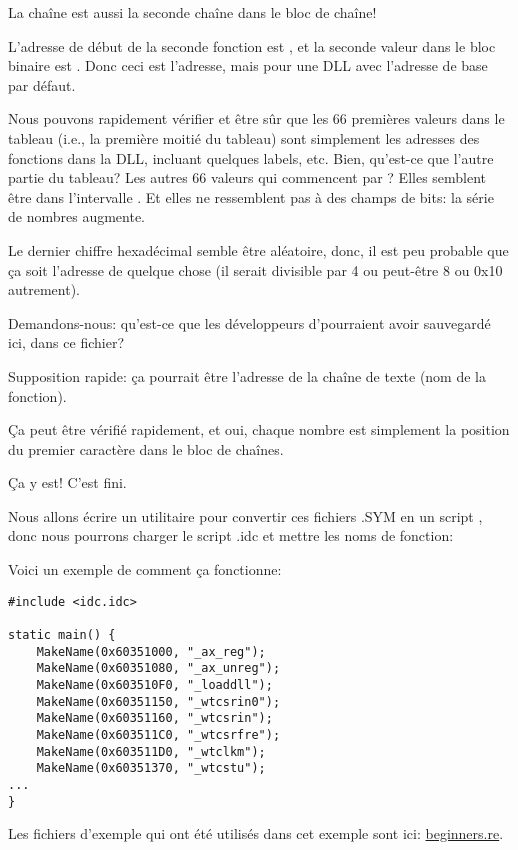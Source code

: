 La chaîne  est aussi la seconde chaîne dans le bloc de chaîne!

L'adresse de début de la seconde fonction est , et la seconde
valeur dans le bloc binaire est .
Donc ceci est l'adresse, mais pour une DLL avec l'adresse de base par défaut.

Nous pouvons rapidement vérifier et être sûr que les 66 premières valeurs dans
le tableau (i.e., la première moitié du tableau) sont simplement les adresses des
fonctions dans la DLL, incluant quelques labels, etc.
Bien, qu'est-ce que l'autre partie du tableau?
Les autres 66 valeurs qui commencent par ?
Elles semblent être dans l'intervalle \TT{[0...0x3F8]}.
Et elles ne ressemblent pas à des champs de bits:
la série de nombres augmente.

Le dernier chiffre hexadécimal semble être aléatoire, donc, il est peu probable
que ça soit l'adresse de quelque chose (il serait divisible par 4 ou peut-être
8 ou 0x10 autrement).

Demandons-nous: qu'est-ce que les développeurs d'\oracle pourraient avoir sauvegardé
ici, dans ce fichier?

Supposition rapide: ça pourrait être l'adresse de la chaîne de texte (nom de la
fonction).

Ça peut être vérifié rapidement, et oui, chaque nombre est simplement la position
du premier caractère dans le bloc de chaînes.

Ça y est! C'est fini.

Nous allons écrire un utilitaire pour convertir ces fichiers .SYM en un script
\IDA, donc nous pourrons charger le script .idc et mettre les noms de fonction:



Voici un exemple de comment ça fonctionne:

\begin{lstlisting}[style=customc]
#include <idc.idc>

static main() {
	MakeName(0x60351000, "_ax_reg");
	MakeName(0x60351080, "_ax_unreg");
	MakeName(0x603510F0, "_loaddll");
	MakeName(0x60351150, "_wtcsrin0");
	MakeName(0x60351160, "_wtcsrin");
	MakeName(0x603511C0, "_wtcsrfre");
	MakeName(0x603511D0, "_wtclkm");
	MakeName(0x60351370, "_wtcstu");
...
}
\end{lstlisting}

Les fichiers d'exemple qui ont été utilisés dans cet exemple sont ici:
\href{http://go.yurichev.com/17216}{beginners.re}.


